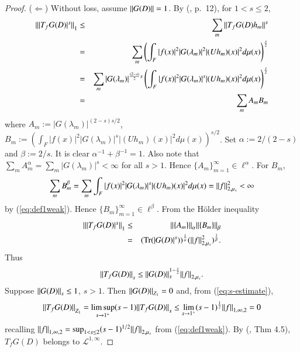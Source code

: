 \documentclass[final,1p]{elsarticle}
\numberwithin{equation}{section}
\theoremstyle{plain}
\theoremstyle{definition}
\begin{document}
\begin{proof}
($\Leftarrow$) 
Without loss, assume ${\mbox{\ensuremath{\| {G(D)} \|}}}=1$.  By (\cite{S}, p.~12), for $1 < s \leq 2$,
\begin{eqnarray*}
{\mbox{\ensuremath{\| {|T_fG(D)|^s} \|}}}_{1}
& \leq & \sum_{m} {\mbox{\ensuremath{\| {T_fG(D)h_m} \|}}}^{s} \\
& = & \sum_{m} \left( \int_F |f(x)|^2 |G(\lambda_m)|^2 |(Uh_m)(x)|^2 d\mu(x) \right)^{\frac s2} \\
& = &
\sum_{m} |G(\lambda_m)|^{\frac{(2-s)}{2}s} \left(\int_F |f(x)|^2 |G(\lambda_m)|^{s} |(Uh_m)(x)|^2 d\mu(x) \right)^{\frac{s}{2}} \\
& = & \sum_m A_m B_m
\end{eqnarray*}
where $A_m := |G(\lambda_m)|^{(2-s)s/2}$, 
$B_m := (\int_F |f(x)|^2 |G(\lambda_m)|^{s} |(Uh_m)(x)|^2 d\mu(x))^{s/2}$.
Set $\alpha := 2/(2-s)$ and $\beta := 2/s$.  It is clear
$\alpha^{-1} + \beta^{-1} = 1$.  Also note that
$\sum_m A_m^\alpha = \sum_m |G(\lambda_m)|^{s} < \infty$ for all $s > 1$.
Hence $\{ A_m \}_{m=1}^\infty \in \ell^\alpha$.  
For $B_m$,
$$
\sum_m B_m^{\beta} = \sum_{m} \int_F |f(x)|^2 |G(\lambda_m)|^{s} |(Uh_m)(x)|^2 d\mu(x) 
 =  {\mbox{\ensuremath{\| {f} \|}}}_{2,\mu_{s}}^2 < \infty
$$
by (\ref{eq:def1weak}). Hence  $\{ B_m \}_{m=1}^\infty \in \ell^\beta$.
From the H\"{o}lder inequality
\begin{eqnarray*}
{\mbox{\ensuremath{\| {|T_fG(D)|^s} \|}}}_{1} & \leq & {\mbox{\ensuremath{\| {\{A_m\}} \|}}}_\alpha {\mbox{\ensuremath{\| {\{B_m \}} \|}}}_\beta \\
& = & ( \operatorname{Tr}(|G(D)|^{s}) )^{\frac 1\alpha} ( {\mbox{\ensuremath{\| {f} \|}}}_{2,\mu_{s}}^2 )^{\frac 1\beta} .
\end{eqnarray*}
Thus
\begin{equation} \label{eq:s-estimate}
{\mbox{\ensuremath{\| {T_fG(D)} \|}}}_s  \leq {\mbox{\ensuremath{\| {G(D)} \|}}}_s^{1-\frac{s}{2}} {\mbox{\ensuremath{\| {f} \|}}}_{2,\mu_s} .
\end{equation}
Suppose ${\mbox{\ensuremath{\| {G(D)} \|}}}_s \leq 1$, $s > 1$.  Then ${\mbox{\ensuremath{\| {G(D)} \|}}}_{Z_1} = 0$
and, from (\ref{eq:s-estimate}),
$$
{\mbox{\ensuremath{\| {T_fG(D)} \|}}}_{Z_1} = \limsup_{s \to 1^+} (s-1){\mbox{\ensuremath{\| {T_fG(D)} \|}}}_s  \leq \lim_{s\to 1^+} (s-1)^{\frac{1}{2}} {\mbox{\ensuremath{\| {f} \|}}}_{1,\infty,2} = 0
$$
recalling ${\mbox{\ensuremath{\| {f} \|}}}_{1,\infty,2} = \sup_{1 < s \leq 2} (s-1)^{1/2} {\mbox{\ensuremath{\| {f} \|}}}_{2,\mu_s}$ from (\ref{eq:def1weak}).
By (\cite{CRSS}, Thm 4.5), $T_fG(D)$ belongs to $\mathcal{L}^{1,\infty}$.


\end{proof}
\end{document}
